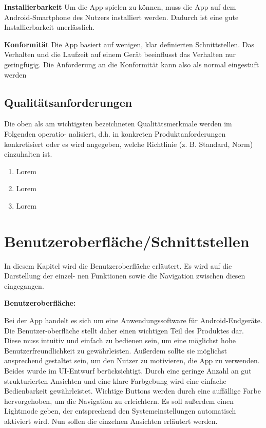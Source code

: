 \documentclass[parskip=full]{scrartcl}
\begin{document}
\textbf{Installierbarkeit}\newline
Um die App spielen zu können, muss die App auf dem Android-Smartphone des Nutzers installiert werden.
Dadurch ist eine gute Installierbarkeit unerlässlich.

\textbf{Konformität}\newline
Die App basiert auf wenigen, klar definierten Schnittstellen. Das Verhalten und die Laufzeit auf einem Gerät beeinflusst das Verhalten nur geringfügig. Die Anforderung an die Konformität kann also als normal eingestuft werden

\subsection{Qualitätsanforderungen}
Die oben als am wichtigsten bezeichneten Qualitätsmerkmale werden im Folgenden operatio- nalisiert, d.h. in konkreten Produktanforderungen konkretisiert oder es wird angegeben, welche Richtlinie (z. B. Standard, Norm) einzuhalten ist.

\begin{enumerate}[start=1,label={$\langle$\bfseries Q\arabic*$\rangle$}, leftmargin = 5em, itemsep=4pt, parsep=4pt]
    \item Lorem
    \item Lorem
    \item Lorem
\end{enumerate}

\section{Benutzeroberfläche/Schnittstellen}
In diesem Kapitel wird die Benutzeroberfläche erläutert. Es wird auf die Darstellung der einzel- nen Funktionen sowie die Navigation zwischen diesen eingegangen.

\textbf{Benutzeroberfläche:}

Bei der App handelt es sich um eine Anwendungssoftware für Android-Endgeräte. Die Benutzer-oberfläche stellt daher einen wichtigen Teil des Produktes dar. Diese muss intuitiv und einfach zu bedienen sein, um eine möglichst hohe Benutzerfreundlichkeit zu gewährleisten. Außerdem sollte sie möglichst ansprechend gestaltet sein, um den Nutzer zu motivieren, die App zu verwenden. Beides wurde im UI-Entwurf berücksichtigt. Durch eine geringe Anzahl an gut strukturierten Ansichten und eine klare Farbgebung wird eine einfache Bedienbarkeit gewährleistet. Wichtige Buttons werden durch eine auffällige Farbe hervorgehoben, um die Navigation zu erleichtern. Es soll außerdem einen Lightmode geben, der entsprechend den Systemeinstellungen automatisch aktiviert wird. Nun sollen die einzelnen Ansichten erläutert werden.
\end{document}
